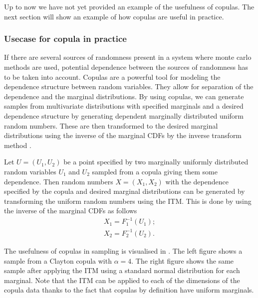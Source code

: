 Up to now we have not yet provided an example of the usefulness of copulas. The next section will show an example of how copulas are useful in practice.

\subsubsection{Usecase for copula in practice}
If there are several sources of randomness present in a system where monte carlo methods are used, potential dependence between the sources of randomness has to be taken into account. Copulas are a powerful tool for modeling the dependence structure between random variables. They allow for separation of the dependence and the marginal distributions. By using copulas, we can generate samples from multivariate distributions with specified marginals and a desired dependence structure by generating dependent marginally distributed uniform random numbers. These are then transformed to the desired marginal distributions using the inverse of the marginal \gls{CDF}s by the inverse transform method .

Let $U = (U_1,U_2)$ be a point specified by two marginally uniformly distributed random variables $U_1$ and $U_2$ sampled from a copula giving them some dependence. Then random numbers $X = (X_1,X_2)$ with the dependence specified by the copula and desired marginal distributions can be generated by transforming the uniform random numbers using the \gls{ITM}. This is done by using the inverse of the marginal \gls{CDF}s as follows
\begin{align*}
    X_1 = F_1^{-1}(U_1); \\
    X_2 = F_2^{-1}(U_2).
\end{align*}

The usefulness of copulas in sampling is visualised in . The left figure shows a sample from a Clayton copula with $\alpha = 4$. The right figure shows the same sample after applying the \gls{ITM} using a standard normal distribution for each marginal. Note that the \gls{ITM} can be applied to each of the dimensions of the copula data thanks to the fact that copulas by definition have uniform marginals. 


